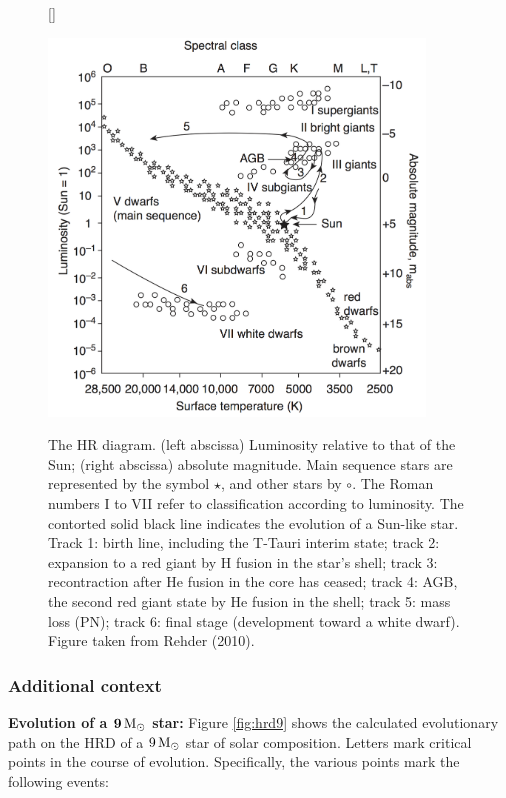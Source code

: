 \documentclass[a4paper,10pt]{article}
\begin{document}
\begin{figure}[h]
    [\FBwidth]
    {\caption{\footnotesize{The HR diagram. (left abscissa) Luminosity relative to that of the Sun; (right abscissa) absolute magnitude. Main sequence stars are represented by the symbol $\star$, and other stars by $\circ$. The Roman numbers I to VII refer to classification according to luminosity. The contorted solid black line indicates the evolution of a Sun-like star. Track 1: birth line, including the T-Tauri interim state; track 2: expansion to a red giant by H fusion in the star’s shell; track 3: recontraction after He fusion in the core has ceased; track 4: AGB, the second red giant state by He fusion in the shell; track 5: mass loss (PN); track 6: final stage (development toward a white dwarf). Figure taken from Rehder (2010).}}
    \label{fig:hrd}}
    {\includegraphics[width=10cm]{figures/HRD.png}}
\end{figure}

\subsubsection{Additional context}

{\noindent}\textbf{Evolution of a $\mathbf{9\,{\rm M_\odot}}$ star:} Figure \ref{fig:hrd9} shows the calculated evolutionary path on the HRD of a $9\,{\rm M_\odot}$ star of solar composition. Letters mark critical points in the course of evolution. Specifically, the various points mark the following events:
\end{document}
